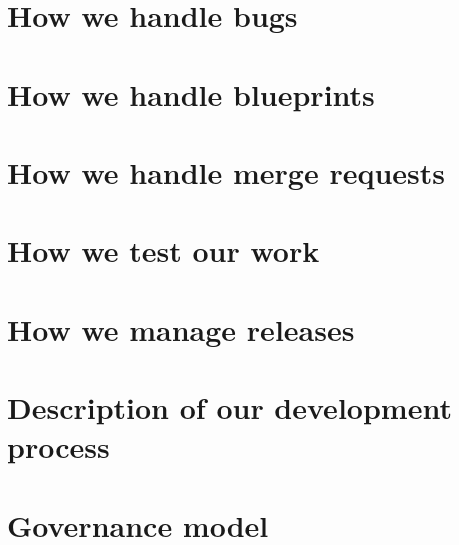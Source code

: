 \section{How we handle bugs}
\section{How we handle blueprints}
\section{How we handle merge requests}
\section{How we test our work}
\section{How we manage releases}
\section{Description of our development process}
\section{Governance model}